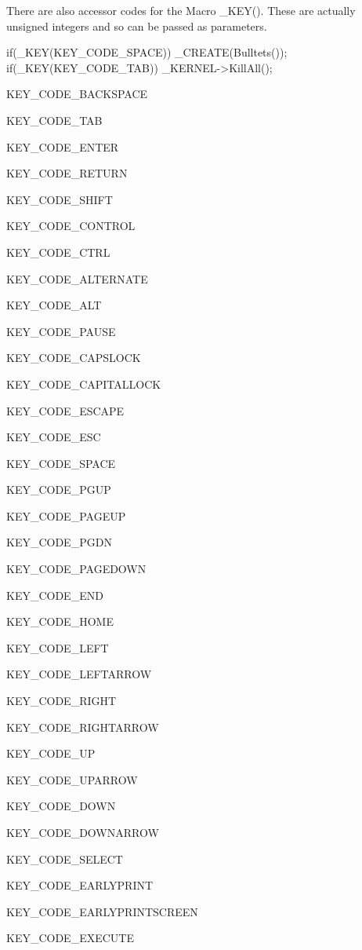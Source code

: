 There are also accessor codes for the Macro \_\-KEY(). These are actually unsigned integers and so can be passed as parameters.


\begin{DoxyCode}
 if(_KEY(KEY_CODE_SPACE)) _CREATE(Bulltets());
 if(_KEY(KEY_CODE_TAB)) _KERNEL->KillAll();
\end{DoxyCode}


KEY\_\-CODE\_\-BACKSPACE \par
 KEY\_\-CODE\_\-TAB \par
 KEY\_\-CODE\_\-ENTER \par
 KEY\_\-CODE\_\-RETURN \par
 KEY\_\-CODE\_\-SHIFT \par
 KEY\_\-CODE\_\-CONTROL \par
 KEY\_\-CODE\_\-CTRL \par
 KEY\_\-CODE\_\-ALTERNATE \par
 KEY\_\-CODE\_\-ALT \par
 KEY\_\-CODE\_\-PAUSE \par
 KEY\_\-CODE\_\-CAPSLOCK \par
 KEY\_\-CODE\_\-CAPITALLOCK \par
 KEY\_\-CODE\_\-ESCAPE \par
 KEY\_\-CODE\_\-ESC \par
 KEY\_\-CODE\_\-SPACE \par
 KEY\_\-CODE\_\-PGUP \par
 KEY\_\-CODE\_\-PAGEUP \par
 KEY\_\-CODE\_\-PGDN \par
 KEY\_\-CODE\_\-PAGEDOWN \par
 KEY\_\-CODE\_\-END \par
 KEY\_\-CODE\_\-HOME \par
 KEY\_\-CODE\_\-LEFT \par
 KEY\_\-CODE\_\-LEFTARROW \par
 KEY\_\-CODE\_\-RIGHT \par
 KEY\_\-CODE\_\-RIGHTARROW \par
 KEY\_\-CODE\_\-UP \par
 KEY\_\-CODE\_\-UPARROW \par
 KEY\_\-CODE\_\-DOWN \par
 KEY\_\-CODE\_\-DOWNARROW \par
 KEY\_\-CODE\_\-SELECT \par
 KEY\_\-CODE\_\-EARLYPRINT \par
 KEY\_\-CODE\_\-EARLYPRINTSCREEN \par
 KEY\_\-CODE\_\-EXECUTE \par
